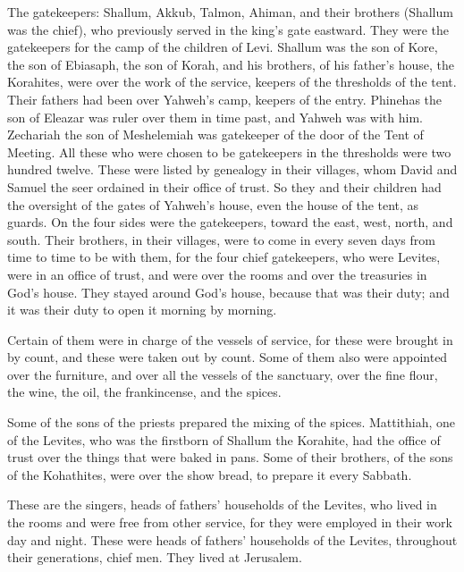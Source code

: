 \begin{paracol}{2}
\begin{otherlanguage}{english}
 The gatekeepers: Shallum, Akkub, Talmon, Ahiman, and
their brothers (Shallum was the chief),  who previously
served in the king's gate eastward. They were the gatekeepers for the
camp of the children of Levi.  Shallum was the son of
Kore, the son of Ebiasaph, the son of Korah, and his brothers, of his
father's house, the Korahites, were over the work of the service,
keepers of the thresholds of the tent. Their fathers had been over
Yahweh's camp, keepers of the entry.  Phinehas the son of
Eleazar was ruler over them in time past, and Yahweh was with him.
 Zechariah the son of Meshelemiah was gatekeeper of the
door of the Tent of Meeting.  All these who were chosen
to be gatekeepers in the thresholds were two hundred twelve. These were
listed by genealogy in their villages, whom David and Samuel the seer
ordained in their office of trust.  So they and their
children had the oversight of the gates of Yahweh's house, even the
house of the tent, as guards.  On the four sides were the
gatekeepers, toward the east, west, north, and south. 
Their brothers, in their villages, were to come in every seven days from
time to time to be with them,  for the four chief
gatekeepers, who were Levites, were in an office of trust, and were over
the rooms and over the treasuries in God's house.  They
stayed around God's house, because that was their duty; and it was their
duty to open it morning by morning.

 Certain of them were in charge of the vessels of
service, for these were brought in by count, and these were taken out by
count.  Some of them also were appointed over the
furniture, and over all the vessels of the sanctuary, over the fine
flour, the wine, the oil, the frankincense, and the spices.

 Some of the sons of the priests prepared the mixing of
the spices.  Mattithiah, one of the Levites, who was the
firstborn of Shallum the Korahite, had the office of trust over the
things that were baked in pans.  Some of their brothers,
of the sons of the Kohathites, were over the show bread, to prepare it
every Sabbath.

 These are the singers, heads of fathers' households of
the Levites, who lived in the rooms and were free from other service,
for they were employed in their work day and night. 
These were heads of fathers' households of the Levites, throughout their
generations, chief men. They lived at Jerusalem.


\end{otherlanguage}
\end{paracol}
